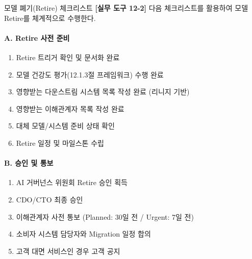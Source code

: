 \begin{practicaltool}{모델 폐기(Retire) 체크리스트}
\textbf{[실무 도구 12-2]} 다음 체크리스트를 활용하여 모델 Retire를 체계적으로 수행한다.

\paragraph{A. Retire 사전 준비}
\begin{enumerate}
 \item[$\square$] Retire 트리거 확인 및 문서화 완료
 \item[$\square$] 모델 건강도 평가(12.1.3절 프레임워크) 수행 완료
 \item[$\square$] 영향받는 다운스트림 시스템 목록 작성 완료 (리니지 기반)
 \item[$\square$] 영향받는 이해관계자 목록 작성 완료
 \item[$\square$] 대체 모델/시스템 준비 상태 확인
 \item[$\square$] Retire 일정 및 마일스톤 수립
\end{enumerate}

\paragraph{B. 승인 및 통보}
\begin{enumerate}
 \item[$\square$] AI 거버넌스 위원회 Retire 승인 획득
 \item[$\square$] CDO/CTO 최종 승인
 \item[$\square$] 이해관계자 사전 통보 (Planned: 30일 전 / Urgent: 7일 전)
 \item[$\square$] 소비자 시스템 담당자와 Migration 일정 합의
 \item[$\square$] 고객 대면 서비스인 경우 고객 공지
\end{enumerate}


\end{practicaltool}

